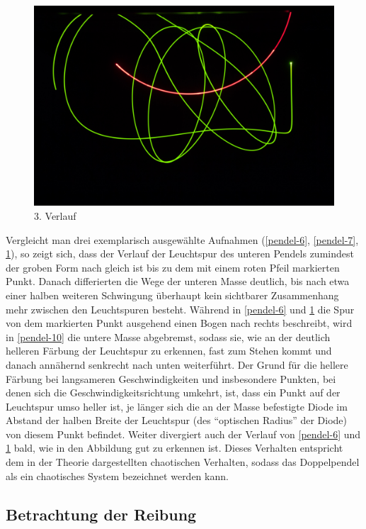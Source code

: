 \begin{figure}
        \includegraphics[width=.9\textwidth]{images/pendel-9}
\caption{3. Verlauf}
\label{pendel-9}
\end{figure}



Vergleicht man drei exemplarisch ausgewählte Aufnahmen (\ref{pendel-6}, \ref{pendel-7}, \ref{pendel-9}), so zeigt sich, dass der Verlauf der Leuchtspur des unteren Pendels zumindest der groben Form nach gleich ist bis zu dem mit einem roten Pfeil markierten Punkt. Danach differierten die Wege der unteren Masse deutlich, bis nach etwa einer halben weiteren Schwingung überhaupt kein sichtbarer Zusammenhang mehr zwischen den Leuchtspuren besteht. Während in \ref{pendel-6} und \ref{pendel-9} die Spur von dem markierten Punkt ausgehend einen Bogen nach rechts beschreibt, wird in \ref{pendel-10} die untere Masse abgebremst, sodass sie, wie an der deutlich helleren Färbung der Leuchtspur zu erkennen, fast zum Stehen kommt und danach annähernd senkrecht nach unten weiterführt. Der Grund für die hellere Färbung bei langsameren Geschwindigkeiten und insbesondere Punkten, bei denen sich die Geschwindigkeitsrichtung umkehrt, ist, dass ein Punkt auf der Leuchtspur umso heller ist, je länger sich die an der Masse befestigte Diode im Abstand der halben Breite der Leuchtspur (des \enquote{optischen Radius} der Diode) von diesem Punkt befindet. 
Weiter divergiert auch der Verlauf von \ref{pendel-6} und \ref{pendel-9} bald, wie in den Abbildung gut zu erkennen ist. 
Dieses Verhalten entspricht dem in der Theorie dargestellten chaotischen Verhalten, sodass das Doppelpendel als ein chaotisches System bezeichnet werden kann. 

\subsection{Betrachtung der Reibung}
